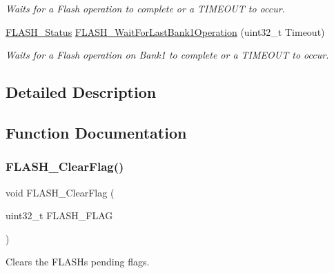 \begin{DoxyCompactItemize}
\begin{DoxyCompactList}\small\item\em Waits for a Flash operation to complete or a T\+I\+M\+E\+O\+UT to occur. \end{DoxyCompactList}\item 
\hyperlink{group___f_l_a_s_h___exported___types_gadc63a6f3404ff1f71229a66915e9cdc0}{F\+L\+A\+S\+H\+\_\+\+Status} \hyperlink{group___f_l_a_s_h___private___functions_ga470d345c2ea4304f899aa988bdd23824}{F\+L\+A\+S\+H\+\_\+\+Wait\+For\+Last\+Bank1\+Operation} (uint32\+\_\+t Timeout)
\begin{DoxyCompactList}\small\item\em Waits for a Flash operation on Bank1 to complete or a T\+I\+M\+E\+O\+UT to occur. \end{DoxyCompactList}\end{DoxyCompactItemize}


\subsection{Detailed Description}


\subsection{Function Documentation}
\mbox{\label{group___f_l_a_s_h___private___functions_gac4be1d486483fa5cd70ec77d44ca8f87}} 
\subsubsection{\texorpdfstring{F\+L\+A\+S\+H\+\_\+\+Clear\+Flag()}{FLASH\_ClearFlag()}}
{\footnotesize\ttfamily void F\+L\+A\+S\+H\+\_\+\+Clear\+Flag (\begin{DoxyParamCaption}\item[{uint32\+\_\+t}]{F\+L\+A\+S\+H\+\_\+\+F\+L\+AG }\end{DoxyParamCaption})}



Clears the F\+L\+A\+SH\textquotesingle{}s pending flags. 

